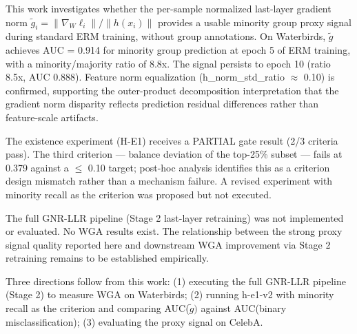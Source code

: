 
This work investigates whether the per-sample normalized last-layer gradient norm $\tilde{g}_i = \|\nabla _W \ell _{i}\| / \|h(x_{i})\|$ provides a usable minority group proxy signal during standard ERM training, without group annotations. On Waterbirds, $\tilde{g}$ achieves AUC = 0.914 for minority group prediction at epoch 5 of ERM training, with a minority/majority ratio of 8.8x. The signal persists to epoch 10 (ratio 8.5x, AUC 0.888). Feature norm equalization (h\_norm\_std\_ratio $\approx$ 0.10) is confirmed, supporting the outer-product decomposition interpretation that the gradient norm disparity reflects prediction residual differences rather than feature-scale artifacts.

The existence experiment (H-E1) receives a PARTIAL gate result (2/3 criteria pass). The third criterion --- balance deviation of the top-25\% subset --- fails at 0.379 against a $\leq$ 0.10 target; post-hoc analysis identifies this as a criterion design mismatch rather than a mechanism failure. A revised experiment with minority recall as the criterion was proposed but not executed.

The full GNR-LLR pipeline (Stage 2 last-layer retraining) was not implemented or evaluated. No WGA results exist. The relationship between the strong proxy signal quality reported here and downstream WGA improvement via Stage 2 retraining remains to be established empirically.

Three directions follow from this work: (1) executing the full GNR-LLR pipeline (Stage 2) to measure WGA on Waterbirds; (2) running h-e1-v2 with minority recall as the criterion and comparing AUC($\tilde{g})$ against AUC(binary misclassification); (3) evaluating the proxy signal on CelebA.

